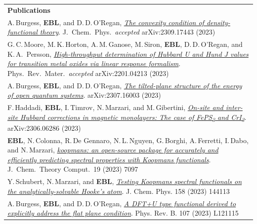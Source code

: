 \documentclass[10pt,a4paper,final]{article}
\begin{document}
\begin{tabularx}{\textwidth}{
   X}
   \rowcolor{seaborn_blue}
      \large\textcolor{seaborn_bg_grey_half}{\textbf{Publications}} \\
   \footnotesize A.\,Burgess, \textbf{EBL}, and D.\,D.\,O'Regan, \href{https://arxiv.org/abs/2309.17443}{\textit{The convexity condition of density-functional theory}}. J.\ Chem.\ Phys.\ \emph{accepted} arXiv:2309.17443 (2023)
   \\
   \footnotesize G.\,C.\,Moore, M.\,K.\,Horton, A.\,M.\,Ganose, M.\,Siron, \textbf{EBL}, D.\,D.\,O'Regan, and K.\,A.\, Persson, \href{https://arxiv.org/abs/2201.04213}{\textit{High-throughput determination of Hubbard U and Hund J values for transition metal oxides via linear response formalism}}. Phys.\ Rev.\ Mater.\ \emph{accepted} arXiv:2201.04213 (2023) \\
   \footnotesize A.\,Burgess, \textbf{EBL}, and D.\,D.\,O'Regan, \href{https://arxiv.org/abs/2307.16003}{\textit{The tilted-plane structure of the energy of open quantum systems}}. arXiv:2307.16003 (2023)
   \\
   \footnotesize F.\,Haddadi, \textbf{EBL}, I.\,Timrov, N.\,Marzari, and M.\,Gibertini, \href{https://arxiv.org/abs/2306.06286}{\textit{On-site and inter-site Hubbard corrections in magnetic monolayers: The case of FePS\textsubscript{3} and CrI\textsubscript{3}}}. arXiv:2306.06286 (2023)
   \\
   \footnotesize \textbf{EBL}, N.\,Colonna, R.\,De Gennaro, N.\,L.\,Nguyen, G.\,Borghi, A.\,Ferretti, I.\,Dabo, and N.\,Marzari, \href{https://doi.org/10.1021/acs.jctc.3c00652}{\textit{koopmans: an open-source package for accurately and efficiently predicting spectral properties with Koopmans functionals}}. J.\ Chem.\  Theory Comput.\ 19 (2023) 7097
   \\
   \footnotesize Y.\,Schubert, N.\,Marzari, and \textbf{EBL}, \href{https://doi.org/10.1063/5.0138610}{\textit{Testing Koopmans spectral functionals on the analytically-solvable Hooke's atom}}. J. Chem. Phys. 158 (2023) 144113
   \\
   \footnotesize A.\,Burgess, \textbf{EBL}, and D.\,D.\,O'Regan, \href{https://doi.org/10.1103/PhysRevB.107.L121115}{\textit{A DFT+U type functional derived to explicitly address the flat plane condition}}. Phys. Rev. B. 107 (2023) L121115
   \\

\end{tabularx}
\end{document}
